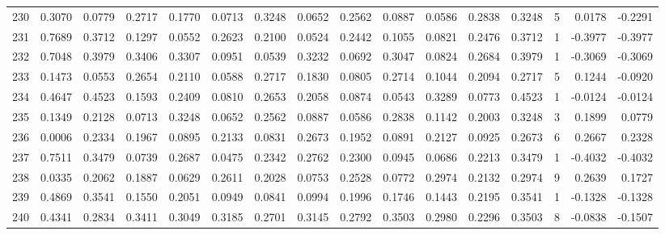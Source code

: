 \begin{tabular}{lrrrrrrrrrrrrrrr}
230 &      0.3070 &  0.0779 &  0.2717 &  0.1770 &  0.0713 &  0.3248 &  0.0652 &  0.2562 &  0.0887 &  0.0586 &   0.2838 &     0.3248 &      5 &                    0.0178 &                    -0.2291 \\
231 &      0.7689 &  0.3712 &  0.1297 &  0.0552 &  0.2623 &  0.2100 &  0.0524 &  0.2442 &  0.1055 &  0.0821 &   0.2476 &     0.3712 &      1 &                   -0.3977 &                    -0.3977 \\
232 &      0.7048 &  0.3979 &  0.3406 &  0.3307 &  0.0951 &  0.0539 &  0.3232 &  0.0692 &  0.3047 &  0.0824 &   0.2684 &     0.3979 &      1 &                   -0.3069 &                    -0.3069 \\
233 &      0.1473 &  0.0553 &  0.2654 &  0.2110 &  0.0588 &  0.2717 &  0.1830 &  0.0805 &  0.2714 &  0.1044 &   0.2094 &     0.2717 &      5 &                    0.1244 &                    -0.0920 \\
234 &      0.4647 &  0.4523 &  0.1593 &  0.2409 &  0.0810 &  0.2653 &  0.2058 &  0.0874 &  0.0543 &  0.3289 &   0.0773 &     0.4523 &      1 &                   -0.0124 &                    -0.0124 \\
235 &      0.1349 &  0.2128 &  0.0713 &  0.3248 &  0.0652 &  0.2562 &  0.0887 &  0.0586 &  0.2838 &  0.1142 &   0.2003 &     0.3248 &      3 &                    0.1899 &                     0.0779 \\
236 &      0.0006 &  0.2334 &  0.1967 &  0.0895 &  0.2133 &  0.0831 &  0.2673 &  0.1952 &  0.0891 &  0.2127 &   0.0925 &     0.2673 &      6 &                    0.2667 &                     0.2328 \\
237 &      0.7511 &  0.3479 &  0.0739 &  0.2687 &  0.0475 &  0.2342 &  0.2762 &  0.2300 &  0.0945 &  0.0686 &   0.2213 &     0.3479 &      1 &                   -0.4032 &                    -0.4032 \\
238 &      0.0335 &  0.2062 &  0.1887 &  0.0629 &  0.2611 &  0.2028 &  0.0753 &  0.2528 &  0.0772 &  0.2974 &   0.2132 &     0.2974 &      9 &                    0.2639 &                     0.1727 \\
239 &      0.4869 &  0.3541 &  0.1550 &  0.2051 &  0.0949 &  0.0841 &  0.0994 &  0.1996 &  0.1746 &  0.1443 &   0.2195 &     0.3541 &      1 &                   -0.1328 &                    -0.1328 \\
240 &      0.4341 &  0.2834 &  0.3411 &  0.3049 &  0.3185 &  0.2701 &  0.3145 &  0.2792 &  0.3503 &  0.2980 &   0.2296 &     0.3503 &      8 &                   -0.0838 &                    -0.1507 \\

\end{tabular}
